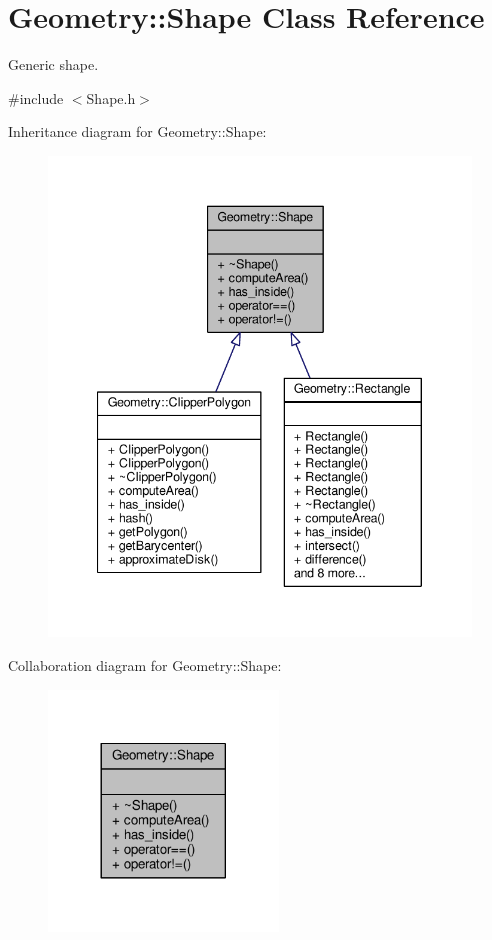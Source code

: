 \hypertarget{classGeometry_1_1Shape}{}\section{Geometry\+:\+:Shape Class Reference}
\label{classGeometry_1_1Shape}


Generic shape.  




{\ttfamily \#include $<$Shape.\+h$>$}



Inheritance diagram for Geometry\+:\+:Shape\+:\nopagebreak
\begin{figure}[H]
\begin{center}
\leavevmode
\includegraphics[width=340pt]{classGeometry_1_1Shape__inherit__graph}
\end{center}
\end{figure}


Collaboration diagram for Geometry\+:\+:Shape\+:\nopagebreak
\begin{figure}[H]
\begin{center}
\leavevmode
\includegraphics[width=173pt]{classGeometry_1_1Shape__coll__graph}
\end{center}
\end{figure}
